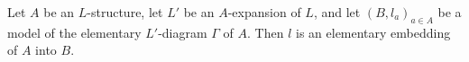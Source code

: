 Let $A$ be an $L$-structure, let $L'$ be an $A$-expansion of $L$, and let $(B, l_a)_{a \in A}$ be a model of the elementary $L'$-diagram $\Gamma$ of $A$. Then $l$ is an elementary embedding of $A$ into $B$.

